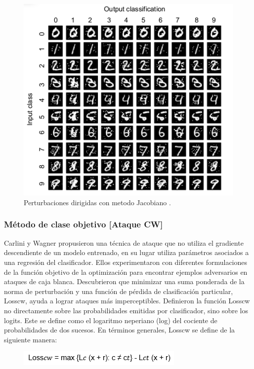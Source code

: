 \begin{figure}[th]
\centering
\includegraphics [scale = 1] {Figures/figura_22.PNG}
\decoRule
\caption[Mapa]{Perturbaciones dirigidas con metodo Jacobiano \parencite{r13}.}
\label{fig:22}
\end{figure}




\subsubsection{Método de clase objetivo [Ataque CW]}
Carlini y Wagner \parencite{r55} propusieron una técnica de ataque que no utiliza el gradiente descendiente de un modelo entrenado, en su lugar utiliza parámetros asociados a una regresión del clasificador. Ellos experimentaron con diferentes formulaciones de la función objetivo de la optimización para encontrar ejemplos adversarios en ataques de caja blanca. Descubrieron que minimizar una suma ponderada de la norma de perturbación y una función de pérdida de clasificación particular, Losscw, ayuda a lograr ataques más imperceptibles. Definieron la función Losscw no directamente sobre las probabilidades emitidas por clasificador, sino sobre los logits. Este se define como el logaritmo neperiano (log) del cociente de probabilidades de dos sucesos. En términos generales, Losscw se define de la siguiente manera: 

\begin{figure}[th]
\centering
\includegraphics [scale = 0.75]{Figures/formula3.PNG}
\label{fig:f3}
\end{figure}

